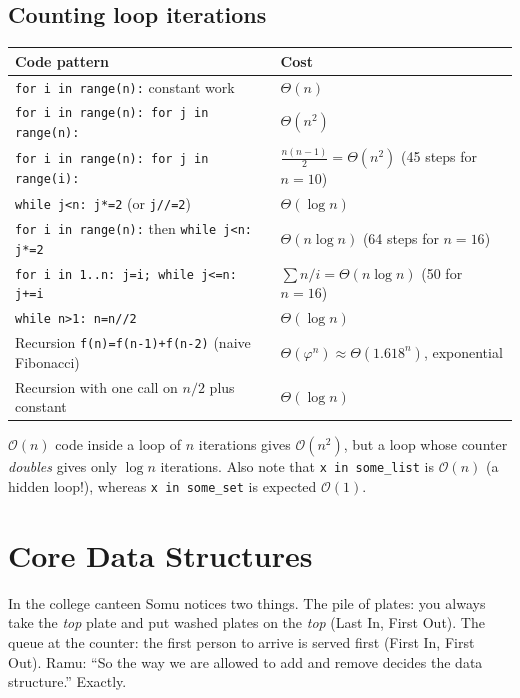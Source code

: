 \documentclass[11pt,a4paper]{article}
\newcommand{\Oh}{\mathcal{O}}
\newcommand{\py}[1]{\texttt{#1}}
\begin{document}
\subsection{Counting loop iterations}
\begin{center}
\begin{tabularx}{\textwidth}{>{\raggedright\arraybackslash}p{6.2cm} >{\raggedright\arraybackslash}X}
\toprule
\textbf{Code pattern} & \textbf{Cost}\\
\midrule
\py{for i in range(n):} constant work & $\Theta(n)$\\
\py{for i in range(n): for j in range(n):} & $\Theta(n^2)$\\
\py{for i in range(n): for j in range(i):} & $\frac{n(n-1)}2=\Theta(n^2)$ (45 steps for $n=10$)\\
\py{while j<n: j*=2} (or \py{j//=2}) & $\Theta(\log n)$\\
\py{for i in range(n):} then \py{while j<n: j*=2} & $\Theta(n\log n)$ (64 steps for $n=16$)\\
\py{for i in 1..n: j=i; while j<=n: j+=i} & $\sum n/i=\Theta(n\log n)$ (50 for $n=16$)\\
\py{while n>1: n=n//2} & $\Theta(\log n)$\\
Recursion \py{f(n)=f(n-1)+f(n-2)} (naive Fibonacci) & $\Theta(\varphi^n)\approx\Theta(1.618^n)$, exponential\\
Recursion with one call on $n/2$ plus constant & $\Theta(\log n)$\\
\bottomrule
\end{tabularx}
\end{center}

\begin{trap}
$\Oh(n)$ code inside a loop of $n$ iterations gives $\Oh(n^2)$, but a loop whose counter \emph{doubles} gives only $\log n$ iterations. Also note that \py{x in some\_list} is $\Oh(n)$ (a hidden loop!), whereas \py{x in some\_set} is expected $\Oh(1)$.
\end{trap}

\newpage
\section{Core Data Structures}

\begin{story}
In the college canteen Somu notices two things. The pile of plates: you always take the \emph{top} plate and put washed plates on the \emph{top} (Last In, First Out). The queue at the counter: the first person to arrive is served first (First In, First Out). Ramu: ``So the way we are allowed to add and remove decides the data structure.'' Exactly.
\end{story}
\end{document}
